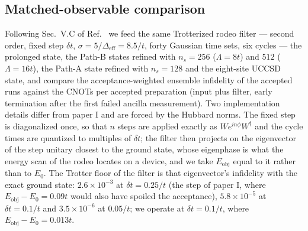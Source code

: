 \documentclass[
  aps,
  prc,
  reprint,
  superscriptaddress,
  floatfix,
  nofootinbib
]{revtex4-2}
\newcommand{\Eobj}{E_{\mathrm{obj}}}
\newcommand{\Deff}{\Delta_{\mathrm{eff}}}
\begin{document}
\subsection{Matched-observable comparison}
\label{sec:budget}
Following Sec.~V.C of Ref.~\cite{EigenQPairing2026} we feed the same
Trotterized rodeo filter --- second order, fixed step $\delta t$, $\sigma=5/\Deff=8.5/t$,
forty Gaussian time sets, six cycles --- the prolonged state, the Path-B
states refined with $n_s=256$ ($\Lambda=8t$) and $512$ ($\Lambda=16t$), the
Path-A state refined with $n_s=128$ and the eight-site UCCSD state, and
compare the acceptance-weighted ensemble infidelity of the accepted runs
against the CNOTs per accepted preparation (input plus filter, early
termination after the first failed ancilla measurement).  Two
implementation details differ from paper I and are forced by the Hubbard
norms.  The fixed step is diagonalized once, so that $n$ steps are applied
exactly as $We^{in\phi}W^\dagger$ and the cycle times are quantized to
multiples of $\delta t$; the filter then projects on the eigenvector of the
step unitary closest to the ground state, whose eigenphase is what the
energy scan of the rodeo locates on a device, and we take
$\Eobj$ equal to it rather than to $E_0$.  The Trotter floor of the filter is
that eigenvector's infidelity with the exact ground state:
$2.6\times10^{-3}$ at $\delta t=0.25/t$ (the step of paper I, where
$\Eobj-E_0=0.09t$ would also have spoiled the acceptance),
$5.8\times10^{-5}$ at $\delta t=0.1/t$ and $3.5\times10^{-6}$ at $0.05/t$;
we operate at $\delta t=0.1/t$, where $\Eobj-E_0=0.013t$.
\end{document}
